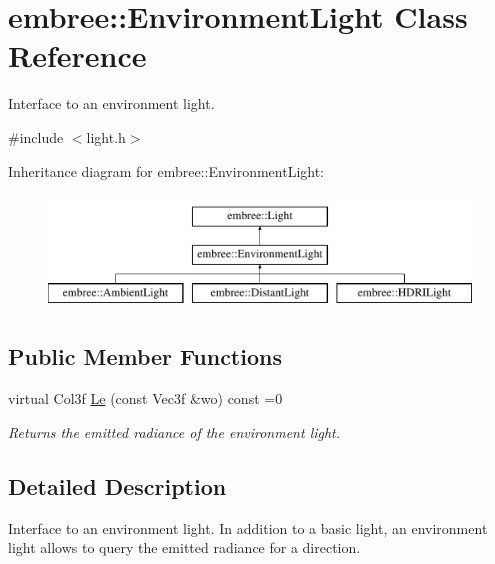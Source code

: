 \hypertarget{classembree_1_1_environment_light}{
\section{embree::EnvironmentLight Class Reference}
\label{classembree_1_1_environment_light}
}


Interface to an environment light.  




{\ttfamily \#include $<$light.h$>$}

Inheritance diagram for embree::EnvironmentLight:\begin{figure}[H]
\begin{center}
\leavevmode
\includegraphics[height=3.000000cm]{classembree_1_1_environment_light}
\end{center}
\end{figure}
\subsection*{Public Member Functions}
\begin{DoxyCompactItemize}
\item 
virtual Col3f \hyperlink{classembree_1_1_environment_light_a4cb3a8e11f5b737c714ceca203bddb8e}{Le} (const Vec3f \&wo) const =0
\begin{DoxyCompactList}\small\item\em Returns the emitted radiance of the environment light. \item\end{DoxyCompactList}\end{DoxyCompactItemize}


\subsection{Detailed Description}
Interface to an environment light. In addition to a basic light, an environment light allows to query the emitted radiance for a direction. 

